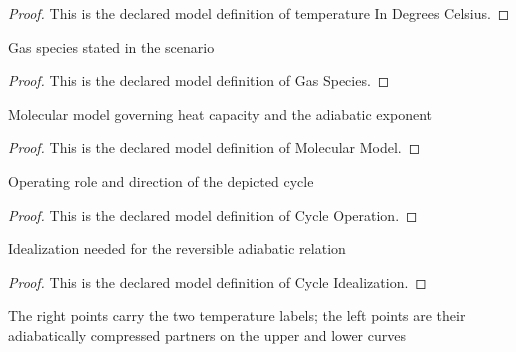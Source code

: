 \begin{proof}
  This is the declared model definition of temperature In Degrees Celsius.
\end{proof}
\begin{definition}
  \label{def:physics:phyx-mini-0431:phyxminiproblems-problemphyxmini0431-gasspecies}
  Gas species stated in the scenario
\end{definition}
\begin{proof}
  This is the declared model definition of Gas Species.
\end{proof}
\begin{definition}
  \label{def:physics:phyx-mini-0431:phyxminiproblems-problemphyxmini0431-molecularmodel}
  Molecular model governing heat capacity and the adiabatic exponent
\end{definition}
\begin{proof}
  This is the declared model definition of Molecular Model.
\end{proof}
\begin{definition}
  \label{def:physics:phyx-mini-0431:phyxminiproblems-problemphyxmini0431-cycleoperation}
  Operating role and direction of the depicted cycle
\end{definition}
\begin{proof}
  This is the declared model definition of Cycle Operation.
\end{proof}
\begin{definition}
  \label{def:physics:phyx-mini-0431:phyxminiproblems-problemphyxmini0431-cycleidealization}
  Idealization needed for the reversible adiabatic relation
\end{definition}
\begin{proof}
  This is the declared model definition of Cycle Idealization.
\end{proof}
\begin{definition}
  \label{def:physics:phyx-mini-0431:phyxminiproblems-problemphyxmini0431-cyclepoint}
  The right points carry the two temperature labels; the left points are their adiabatically compressed partners on the upper and lower curves
\end{definition}

